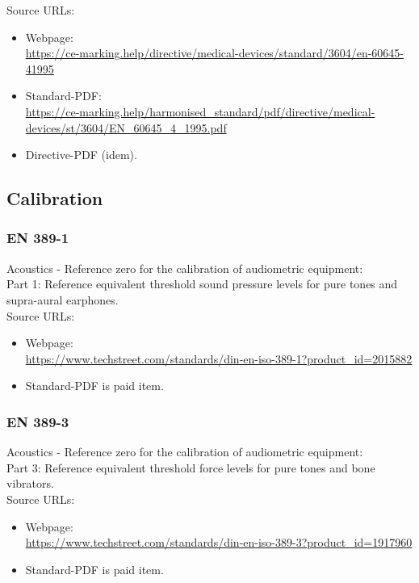 \documentclass[12pt,]{article}
\begin{document}
	Source URLs:
	\begin{itemize}
		\item Webpage:\\
		\url{https://ce-marking.help/directive/medical-devices/standard/3604/en-60645-41995}
		
		\item Standard-PDF:\\
		\url{https://ce-marking.help/harmonised_standard/pdf/directive/medical-devices/st/3604/EN_60645_4_1995.pdf}
		
		\item Directive-PDF (idem).
	\end{itemize}
	
	\subsection{Calibration}
	
	\subsubsection{EN 389-1}
	Acoustics - Reference zero for the calibration of audiometric equipment:\\
	Part 1: Reference equivalent threshold sound pressure levels for pure tones and supra-aural earphones.\\
	
	Source URLs:
	\begin{itemize}
		\item Webpage:\\
		\url{https://www.techstreet.com/standards/din-en-iso-389-1?product_id=2015882}
		
		\item Standard-PDF is paid item.
	\end{itemize}

	\subsubsection{EN 389-3}
	Acoustics - Reference zero for the calibration of audiometric equipment:\\
	Part 3: Reference equivalent threshold force levels for pure tones and bone vibrators.\\
	
	Source URLs:
	\begin{itemize}
		\item Webpage:\\
		\url{https://www.techstreet.com/standards/din-en-iso-389-3?product_id=1917960}
		
		\item Standard-PDF is paid item.
	\end{itemize}
\end{document}
